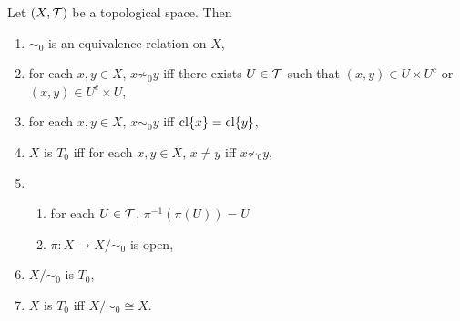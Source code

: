 \documentclass{book}
\begin{document}
	\begin{ex} 
		Let $(X, \mathcal{T})$ be a topological space. Then
		\begin{enumerate}
			\item $\sim_0$ is an equivalence relation on $X$,
			\item for each $x,y \in X$, $x \not \sim_0 y$ iff there exists $U \in \mathcal{T}$ such that $(x,y) \in U \times U^c$ or $(x,y) \in U^c \times U$,
			\item for each $x,y \in X$, $x \sim_0 y$ iff $\operatorname{cl} \{x\} = \operatorname{cl} \{y\}$,
			\item $X$ is $T_0$ iff for each $x,y \in X$, $x \neq y$ iff $x \not \sim_0 y$,
			\item 
			\begin{enumerate}
				\item for each $U \in \mathcal{T}$, $\pi^{-1}(\pi(U)) = U$ 
				\item $\pi: X \rightarrow X / \sim_0$ is open,
			\end{enumerate}
			\item $X/ \sim_0$ is $T_0$,
			\item $X$ is $T_0$ iff $X/\sim_0 \cong X$.
		\end{enumerate}
	\end{ex}
\end{document}
